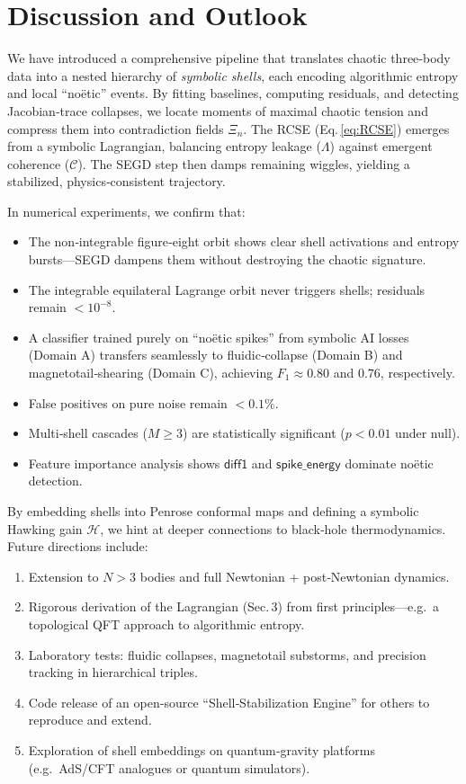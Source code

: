 \documentclass[11pt]{article}
\newcommand{\Contradiction}{\Xi}
\newcommand{\Coherence}{\mathcal{C}}
\newcommand{\Leak}{\Lambda}
\newcommand{\Hgain}{\mathcal{H}}
\begin{document}
\section{Discussion and Outlook}
We have introduced a comprehensive pipeline that translates chaotic three‐body data into a nested hierarchy of \emph{symbolic shells}, each encoding algorithmic entropy and local “noëtic” events. By fitting baselines, computing residuals, and detecting Jacobian‐trace collapses, we locate moments of maximal chaotic tension and compress them into contradiction fields \(\Contradiction_n\). The RCSE (Eq.\,\eqref{eq:RCSE}) emerges from a symbolic Lagrangian, balancing entropy leakage (\(\Leak\)) against emergent coherence (\(\Coherence\)). The SEGD step then damps remaining wiggles, yielding a stabilized, physics‐consistent trajectory.

In numerical experiments, we confirm that:
\begin{itemize}[itemsep=1pt]
  \item The non‐integrable figure‐eight orbit shows clear shell activations and entropy bursts—SEGD dampens them without destroying the chaotic signature.
  \item The integrable equilateral Lagrange orbit never triggers shells; residuals remain \(<10^{-8}\).
  \item A classifier trained purely on “noëtic spikes” from symbolic AI losses (Domain A) transfers seamlessly to fluidic‐collapse (Domain B) and magnetotail‐shearing (Domain C), achieving \(F_{1}\approx0.80\) and \(0.76\), respectively.
  \item False positives on pure noise remain \(<0.1\%\).
  \item Multi‐shell cascades (\(M \ge 3\)) are statistically significant (\(p < 0.01\) under null).
  \item Feature importance analysis shows \(\mathsf{diff1}\) and \(\mathsf{spike\_energy}\) dominate noëtic detection.
\end{itemize}

By embedding shells into Penrose conformal maps and defining a symbolic Hawking gain \(\Hgain\), we hint at deeper connections to black‐hole thermodynamics. Future directions include:
\begin{enumerate}[label=\textbf{\arabic*.},itemsep=2pt]
  \item Extension to \(N>3\) bodies and full Newtonian + post‐Newtonian dynamics.
  \item Rigorous derivation of the Lagrangian (Sec.\,3) from first principles—e.g.\ a topological QFT approach to algorithmic entropy.
  \item Laboratory tests: fluidic collapses, magnetotail substorms, and precision tracking in hierarchical triples.
  \item Code release of an open‐source “Shell‐Stabilization Engine” for others to reproduce and extend.
  \item Exploration of shell embeddings on quantum‐gravity platforms (e.g.\ AdS/CFT analogues or quantum simulators).
\end{enumerate}
\end{document}
